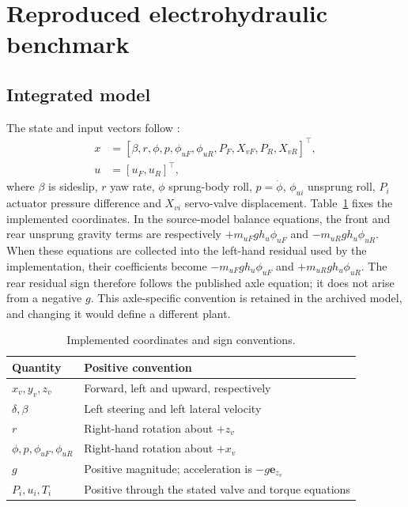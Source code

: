 \documentclass[fleqn,final,5p,times]{elsarticle}
\begin{document}
\section{Reproduced electrohydraulic benchmark}
\label{sec:model}

\subsection{Integrated model}

The state and input vectors follow \cite{vu2017}:
\begin{equation}
\begin{aligned}
x&=[\beta,r,\phi,p,\phi_{uF},\phi_{uR},P_F,X_{vF},P_R,X_{vR}]^\top,\\
u&=[u_F,u_R]^\top,
\end{aligned}
\label{eq:state}
\end{equation}
where $\beta$ is sideslip, $r$ yaw rate, $\phi$ sprung-body roll, $p=\dot\phi$, $\phi_{ui}$ unsprung roll, $P_i$ actuator pressure difference and $X_{vi}$ servo-valve displacement.
Table~\ref{tab:sign-convention} fixes the implemented coordinates. In the source-model balance equations, the front and rear unsprung gravity terms are respectively $+m_{uF}gh_u\phi_{uF}$ and $-m_{uR}gh_u\phi_{uR}$. When these equations are collected into the left-hand residual used by the implementation, their coefficients become $-m_{uF}gh_u\phi_{uF}$ and $+m_{uR}gh_u\phi_{uR}$. The rear residual sign therefore follows the published axle equation; it does not arise from a negative $g$. This axle-specific convention is retained in the archived model, and changing it would define a different plant.

\begin{table}[t]
\centering\small
\caption{Implemented coordinates and sign conventions.}
\label{tab:sign-convention}
\begin{tabularx}{.92\textwidth}{@{}lX@{}}
\toprule
Quantity & Positive convention\\
\midrule
$x_v,y_v,z_v$ & Forward, left and upward, respectively\\
$\delta,\beta$ & Left steering and left lateral velocity\\
$r$ & Right-hand rotation about $+z_v$\\
$\phi,p,\phi_{uF},\phi_{uR}$ & Right-hand rotation about $+x_v$\\
$g$ & Positive magnitude; acceleration is $-g\mathbf e_{z_v}$\\
$P_i,u_i,T_i$ & Positive through the stated valve and torque equations\\
\bottomrule
\end{tabularx}
\end{table}
\end{document}
